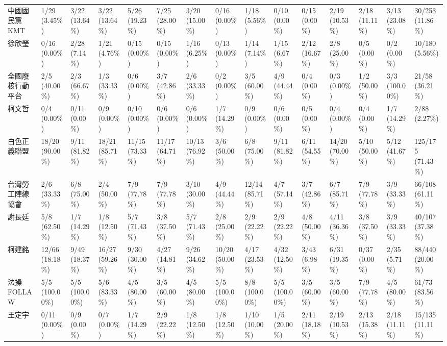 \documentclass[letterpaper, 10pt, conference]{ieeeconf}   %
\begin{document}
\begin{CJK}{UTF8}{bsmi}
\begin{landscape}
\begin{longtable}[c]{@{}L{2.45cm}L{1.1cm}L{1.1cm}L{1.1cm}L{1.1cm}L{1.1cm}L{1.1cm}L{1.1cm}L{1.1cm}L{1.1cm}L{1.1cm}L{1.1cm}L{1.1cm}L{1.1cm}L{1.1cm}@{}}
中國國民黨 KMT & 1/29 (3.45\%) & 3/22 (13.64\%) & 3/22 (13.64\%) & 5/26 (19.23\%) & 7/25 (28.00\%) & 3/20 (15.00\%) & 0/16 (0.00\%) & 1/18 (5.56\%) & 0/10 (0.00\%) & 0/15 (0.00\%) & 2/19 (10.53\%) & 2/18 (11.11\%) & 3/13 (23.08\%) & 30/253 (11.86\%) \\
徐欣瑩 & 0/16 (0.00\%) & 2/28 (7.14\%) & 1/21 (4.76\%) & 0/15 (0.00\%) & 0/15 (0.00\%) & 1/16 (6.25\%) & 0/13 (0.00\%) & 1/14 (7.14\%) & 1/15 (6.67\%) & 2/12 (16.67\%) & 2/8 (25.00\%) & 0/5 (0.00\%) & 0/2 (0.00\%) & 10/180 (5.56\%) \\
全國廢核行動平台 & 2/5 (40.00\%) & 2/3 (66.67\%) & 1/3 (33.33\%) & 0/6 (0.00\%) & 3/7 (42.86\%) & 2/6 (33.33\%) & 0/2 (0.00\%) & 3/5 (60.00\%) & 4/9 (44.44\%) & 0/4 (0.00\%) & 0/3 (0.00\%) & 1/2 (50.00\%) & 3/3 (100.00\%) & 21/58 (36.21\%) \\
柯文哲 & 0/4 (0.00\%) & 0/11 (0.00\%) & 0/9 (0.00\%) & 0/10 (0.00\%) & 0/6 (0.00\%) & 0/6 (0.00\%) & 1/7 (14.29\%) & 0/9 (0.00\%) & 0/6 (0.00\%) & 0/5 (0.00\%) & 0/4 (0.00\%) & 0/4 (0.00\%) & 1/7 (14.29\%) & 2/88 (2.27\%) \\
白色正義聯盟 & 18/20 (90.00\%) & 9/11 (81.82\%) & 18/21 (85.71\%) & 11/15 (73.33\%) & 11/17 (64.71\%) & 10/13 (76.92\%) & 3/6 (50.00\%) & 6/8 (75.00\%) & 9/11 (81.82\%) & 6/11 (54.55\%) & 14/20 (70.00\%) & 5/10 (50.00\%) & 5/12 (41.67\%) & 125/175 (71.43\%) \\
台灣勞工陣線協會 & 2/6 (33.33\%) & 6/8 (75.00\%) & 2/4 (50.00\%) & 7/9 (77.78\%) & 7/9 (77.78\%) & 3/10 (30.00\%) & 4/9 (44.44\%) & 12/14 (85.71\%) & 4/7 (57.14\%) & 3/7 (42.86\%) & 6/7 (85.71\%) & 7/9 (77.78\%) & 3/9 (33.33\%) & 66/108 (61.11\%) \\
謝長廷 & 5/8 (62.50\%) & 1/7 (14.29\%) & 1/8 (12.50\%) & 5/7 (71.43\%) & 3/8 (37.50\%) & 5/7 (71.43\%) & 2/8 (25.00\%) & 2/9 (22.22\%) & 2/9 (22.22\%) & 4/8 (50.00\%) & 4/11 (36.36\%) & 3/8 (37.50\%) & 3/9 (33.33\%) & 40/107 (37.38\%) \\
柯建銘 & 12/66 (18.18\%) & 9/49 (18.37\%) & 16/27 (59.26\%) & 9/30 (30.00\%) & 4/27 (14.81\%) & 9/26 (34.62\%) & 10/20 (50.00\%) & 4/17 (23.53\%) & 4/32 (12.50\%) & 3/43 (6.98\%) & 6/31 (19.35\%) & 0/37 (0.00\%) & 2/35 (5.71\%) & 88/440 (20.00\%) \\
法操FOLLAW & 5/5 (100.00\%) & 5/5 (100.00\%) & 5/6 (83.33\%) & 4/5 (80.00\%) & 3/5 (60.00\%) & 4/5 (80.00\%) & 5/5 (100.00\%) & 8/8 (100.00\%) & 5/5 (100.00\%) & 3/5 (60.00\%) & 3/5 (60.00\%) & 7/9 (77.78\%) & 4/5 (80.00\%) & 61/73 (83.56\%) \\
王定宇 & 0/11 (0.00\%) & 0/9 (0.00\%) & 0/7 (0.00\%) & 1/7 (14.29\%) & 2/9 (22.22\%) & 1/8 (12.50\%) & 1/8 (12.50\%) & 1/10 (10.00\%) & 1/5 (20.00\%) & 2/11 (18.18\%) & 2/19 (10.53\%) & 2/13 (15.38\%) & 2/18 (11.11\%) & 15/135 (11.11\%) \\

\end{longtable}
\end{landscape}
\end{CJK}
\end{document}
